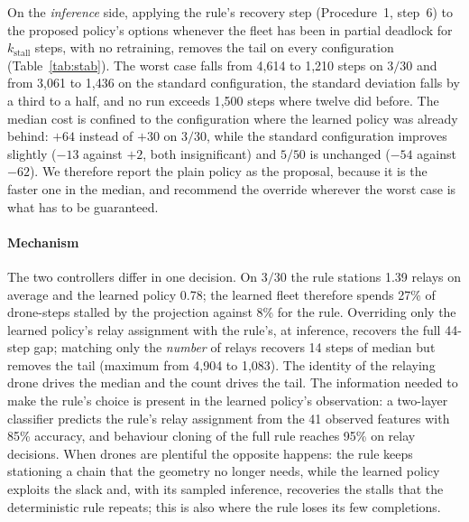 \documentclass[final,5p,times,twocolumn]{elsarticle}
\begin{document}
On the \emph{inference} side, applying the rule's recovery step (Procedure~1, step~6) to the
proposed policy's options whenever the fleet has been in partial deadlock for
$k_{\mathrm{stall}}$ steps, with no retraining, removes the tail on every configuration
(Table~\ref{tab:stab}). The worst case falls from 4{,}614 to 1{,}210 steps on $3/30$ and from
3{,}061 to 1{,}436 on the standard configuration, the standard deviation falls by a third to a
half, and no run exceeds 1{,}500 steps where twelve did before. The median cost is confined to
the configuration where the learned policy was already behind: $+64$ instead of $+30$ on $3/30$,
while the standard configuration improves slightly ($-13$ against $+2$, both insignificant) and
$5/50$ is unchanged ($-54$ against $-62$). We therefore report the plain policy as the proposal,
because it is the faster one in the median, and recommend the override wherever the worst case is
what has to be guaranteed.

\begin{table}[t]
\centering
\caption{Effect of the deadlock-recovery override applied to the proposed policy at inference,
without retraining. The paired median, wins--losses and $p$ are against the tuned rule on the
same instances; the standard deviation, 90th percentile, maximum and the count above 1{,}500 steps
describe the learned policy's own makespan distribution.}
\label{tab:stab}
\small

\end{table}

\paragraph{Mechanism}
The two controllers differ in one decision. On $3/30$ the rule stations 1.39 relays on
average and the learned policy 0.78; the learned fleet therefore spends 27\% of drone-steps stalled
by the projection against 8\% for the rule. Overriding only the learned policy's relay
assignment with the rule's, at inference, recovers the full 44-step gap; matching only the
\emph{number} of relays recovers 14 steps of median but removes the tail (maximum from 4{,}904 to
1{,}083). The identity of the relaying drone drives the median and the count drives the tail. The
information needed to make the rule's choice is present in the learned policy's observation:
a two-layer classifier predicts the rule's relay assignment from the 41 observed features with
85\% accuracy, and behaviour cloning of the full rule reaches 95\% on relay decisions. When drones
are plentiful the opposite happens: the rule keeps stationing a chain that the geometry no
longer needs, while the learned policy exploits the slack and, with its sampled inference, recoveries
the stalls that the deterministic rule repeats; this is also where the rule loses its few
completions.
\end{document}
